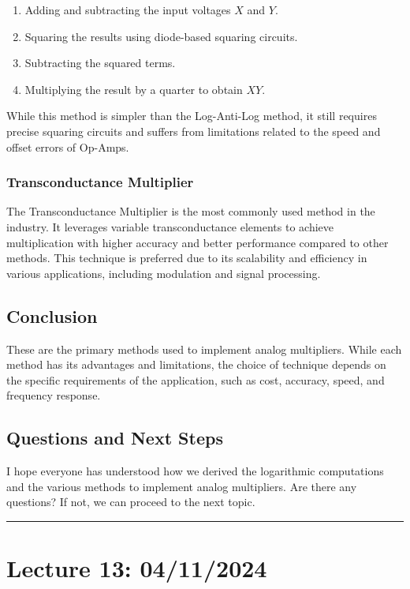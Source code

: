 \documentclass[a4paper,9pt,twoside,openany,twocolumn]{memoir}
\begin{document}
\begin{enumerate}
    \item Adding and subtracting the input voltages \( X \) and \( Y \).
    \item Squaring the results using diode-based squaring circuits.
    \item Subtracting the squared terms.
    \item Multiplying the result by a quarter to obtain \( XY \).
\end{enumerate}

While this method is simpler than the Log-Anti-Log method, it still requires precise squaring circuits and suffers from limitations related to the speed and offset errors of Op-Amps.

\subsubsection*{Transconductance Multiplier}

The Transconductance Multiplier is the most commonly used method in the industry. It leverages variable transconductance elements to achieve multiplication with higher accuracy and better performance compared to other methods. This technique is preferred due to its scalability and efficiency in various applications, including modulation and signal processing.

\subsection*{Conclusion}

These are the primary methods used to implement analog multipliers. While each method has its advantages and limitations, the choice of technique depends on the specific requirements of the application, such as cost, accuracy, speed, and frequency response.

\subsection*{Questions and Next Steps}

I hope everyone has understood how we derived the logarithmic computations and the various methods to implement analog multipliers. Are there any questions? If not, we can proceed to the next topic.
\begin{center}\rule{0.5\linewidth}{0.5pt}\end{center}

\section*{Lecture 13: 04/11/2024}
\end{document}
